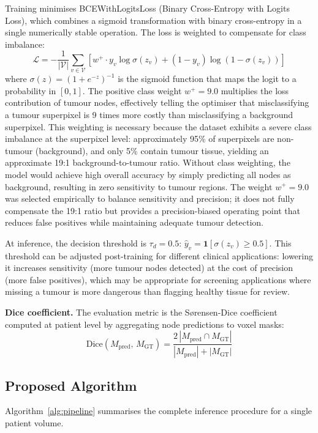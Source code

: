 \documentclass{article}
\begin{document}
Training minimises BCEWithLogitsLoss (Binary Cross-Entropy with Logits Loss), which
combines a sigmoid transformation with binary cross-entropy in a single numerically
stable operation. The loss is weighted to compensate for class imbalance:
\[
    \mathcal{L} = -\frac{1}{|\mathcal{V}|} \sum_{v \in \mathcal{V}} \left[
        w^+ \cdot y_v \log \sigma(z_v) + (1 - y_v) \log(1 - \sigma(z_v))
    \right]
\]
where $\sigma(z) = (1 + e^{-z})^{-1}$ is the sigmoid function that maps the logit
to a probability in $[0, 1]$. The positive class weight $w^+ = 9.0$ multiplies the
loss contribution of tumour nodes, effectively telling the optimiser that
misclassifying a tumour superpixel is 9 times more costly than misclassifying a
background superpixel. This weighting is necessary because the dataset exhibits a
severe class imbalance at the superpixel level: approximately 95\% of superpixels
are non-tumour (background), and only 5\% contain tumour tissue, yielding an
approximate 19:1 background-to-tumour ratio. Without class weighting, the model
would achieve high overall accuracy by simply predicting all nodes as background,
resulting in zero sensitivity to tumour regions. The weight $w^+ = 9.0$ was
selected empirically to balance sensitivity and precision; it does not fully
compensate the 19:1 ratio but provides a precision-biased operating point that
reduces false positives while maintaining adequate tumour detection.

At inference, the decision threshold is $\tau_d = 0.5$:
$\hat{y}_v = \mathbf{1}[\sigma(z_v) \geq 0.5]$. This threshold can be adjusted
post-training for different clinical applications: lowering it increases sensitivity
(more tumour nodes detected) at the cost of precision (more false positives), which
may be appropriate for screening applications where missing a tumour is more
dangerous than flagging healthy tissue for review.

\textbf{Dice coefficient.}
The evaluation metric is the Sørensen-Dice coefficient computed at patient level
by aggregating node predictions to voxel masks:
\[
    \mathrm{Dice}(M_{\text{pred}},\, M_{\text{GT}}) =
    \frac{2\,|M_{\text{pred}} \cap M_{\text{GT}}|}
         {|M_{\text{pred}}| + |M_{\text{GT}}|}
\]

\subsection{Proposed Algorithm}
\label{sec:algorithm}

Algorithm~\ref{alg:pipeline} summarises the complete inference procedure for a
single patient volume.
\end{document}
